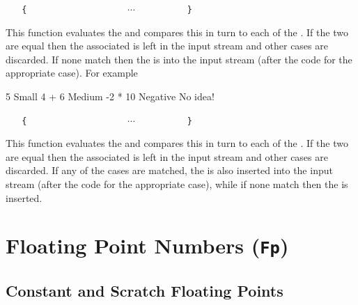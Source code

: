 \documentclass[oneside]{book}
\begin{document}
\begin{function}{\intCaseF}
\begin{syntax}
 
~ ~ \verb|{|
~ ~ ~ ~  
~ ~ ~ ~  
~ ~ ~ ~ $\cdots$
~ ~ ~ ~  
~ ~ \verb|}|
~ ~ 
\end{syntax}
This function evaluates the  and
compares this in turn to each of the
. If the two are equal then the
associated  is left in the input stream
and other cases are discarded. If none
match then the  is into the input stream
(after the code for the appropriate case).
For example
\begin{demohigh}
\IgnoreSpacesOn
{}
  {
    { 5 }       { Small }
    { 4 + 6 }   { Medium }
    { -2 * 10 } { Negative }
  }
  { No idea! }
\IgnoreSpacesOff
\end{demohigh}
\end{function}

\begin{function}{\intCaseTF}
\begin{syntax}
 
~ ~ \verb|{|
~ ~ ~ ~  
~ ~ ~ ~  
~ ~ ~ ~ $\cdots$
~ ~ ~ ~  
~ ~ \verb|}|
~ ~ 
~ ~ 
\end{syntax}
This function evaluates the  and
compares this in turn to each of the
. If the two are equal then the
associated  is left in the input stream
and other cases are discarded. If any of the
cases are matched, the  is also inserted into the
input stream (after the code for the appropriate case), while if none
match then the  is inserted.
\end{function}

\chapter{Floating Point Numbers (\texttt{Fp})}

\section{Constant and Scratch Floating Points}
\end{document}
